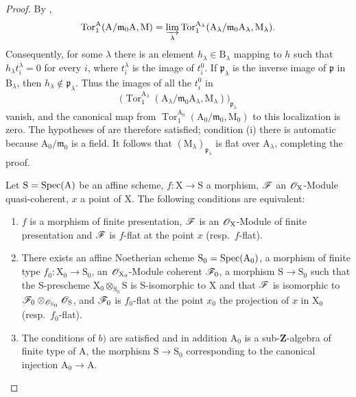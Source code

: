 \begin{proof}
By ,
\[
  \operatorname{Tor}_1^\mathrm A
  (\mathrm A/\mathfrak m_0\mathrm A,\mathrm M)
  =\varinjlim_\lambda
  \operatorname{Tor}_1^{\mathrm A_\lambda}
  (\mathrm A_\lambda/\mathfrak m_0\mathrm A_\lambda,
   \mathrm M_\lambda).
\]
Consequently, for some $\lambda$ there is an element
$h_\lambda\in\mathrm B_\lambda$ mapping to $h$ such that
$h_\lambda t_i^\lambda=0$ for every $i$, where $t_i^\lambda$ is the
image of $t_i^0$. If $\mathfrak p_\lambda$ is the inverse image of
$\mathfrak p$ in $\mathrm B_\lambda$, then
$h_\lambda\notin\mathfrak p_\lambda$. Thus the images of all the
$t_i^0$ in
\[
  \bigl(\operatorname{Tor}_1^{\mathrm A_\lambda}
  (\mathrm A_\lambda/\mathfrak m_0\mathrm A_\lambda,
   \mathrm M_\lambda)\bigr)_{\mathfrak p_\lambda}
\]
vanish, and the canonical map from
$\operatorname{Tor}_1^{\mathrm A_0}
(\mathrm A_0/\mathfrak m_0,\mathrm M_0)$ to this localization is zero.
The hypotheses of  are therefore satisfied; condition
(i) there is automatic because $\mathrm A_0/\mathfrak m_0$ is a field.
It follows that $(\mathrm M_\lambda)_{\mathfrak p_\lambda}$ is flat
over $\mathrm A_\lambda$, completing the proof.

\begin{corollary}[11.2.7]
\label{IV.11.2.7}
Let $\mathrm{S}=\operatorname{Spec}(\mathrm{A})$ be an affine scheme, $f:\mathrm{X}\to\mathrm{S}$ a morphism, $\mathscr{F}$ an $\mathscr{O}_\mathrm{X}$-Module quasi-coherent, $x$ a point of $\mathrm{X}$. The following conditions are equivalent:
\begin{enumerate}[label=\emph{\alph*)}]
  \item $f$ is a morphism of finite presentation, $\mathscr{F}$ is an $\mathscr{O}_\mathrm{X}$-Module of finite presentation and $\mathscr{F}$ is $f$-flat at the point $x$ (resp.\ $f$-flat).
  \item There exists an affine Noetherian scheme $\mathrm{S}_0=\operatorname{Spec}(\mathrm{A}_0)$, a morphism of finite type $f_0:\mathrm{X}_0\to\mathrm{S}_0$, an $\mathscr{O}_{\mathrm{X}_0}$-Module coherent $\mathscr{F}_0$, a morphism $\mathrm{S}\to\mathrm{S}_0$ such that the S-prescheme $\mathrm{X}_0\otimes_{\mathrm{S}_0}\mathrm{S}$ is S-isomorphic to $\mathrm{X}$ and that $\mathscr{F}$ is isomorphic to $\mathscr{F}_0\otimes_{\mathscr{O}_{\mathrm{S}_0}}\mathscr{O}_\mathrm{S}$, and $\mathscr{F}_0$ is $f_0$-flat at the point $x_0$ the projection of $x$ in $\mathrm{X}_0$ (resp.\ $f_0$-flat).
  \item The conditions of $b)$ are satisfied and in addition $\mathrm{A}_0$ is a sub-$\mathbf{Z}$-algebra of finite type of $\mathrm{A}$, the morphism $\mathrm{S}\to\mathrm{S}_0$ corresponding to the canonical injection $\mathrm{A}_0\to\mathrm{A}$.
\end{enumerate}
\end{corollary}


\end{proof}
